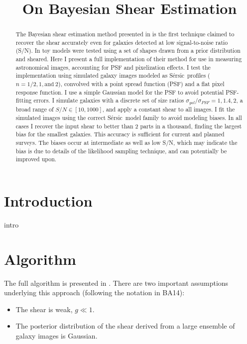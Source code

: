 \documentclass[12pt,preprint]{aastex}
\newcommand{\sersic}{S\'{e}rsic}
\begin{document}
\title{On Bayesian Shear Estimation}



\begin{abstract}

    The Bayesian shear estimation method presented in \cite{ba14} is the first
    technique claimed to recover the shear accurately even for galaxies
    detected at low signal-to-noise ratio (S/N).  In toy models were tested
    using a set of shapes drawn from a prior distribution and sheared.  Here I
    present a full implementation of their method for use in measuring
    astronomical images, accounting for PSF and pixelization effects.  I test
    the implementation using simulated galaxy images modeled as \sersic\
    profiles ($n=1/2, 1, \textrm{and} ~ 2$), convolved with a point spread
    function (PSF) and a flat pixel response function.  I use a simple Gaussian
    model for the PSF to avoid potential PSF-fitting errors. I simulate
    galaxies with a discrete set of size ratios $\sigma_{gal}/\sigma_{PSF} = 1,
    1.4, 2$, a broad range of $S/N \in [10,1000]$, and apply a constant shear
    to all images. I fit the simulated images using the correct
    \sersic\ model family to avoid modeling biases.   In all cases I recover
    the input shear to better than 2 parts in a thousand, finding the largest
    bias for the smallest galaxies.  This accuracy is sufficient for current
    and planned surveys.   The biases occur at intermediate as well as low S/N,
    which may indicate the bias is due to details of the likelihood sampling
    technique, and can potentially be improved upon.   

\end{abstract}

\section{Introduction} \label{sec:intro}

intro

\section{Algorithm} \label{sec:algo}

The full algorithm is presented in \citet[][BA14]{ba14}.  There are two
important assumptions underlying this approach (following the notation in
BA14):

\begin{itemize}

    \item The shear is weak, $g \ll 1$.

    \item The posterior distribution of the shear derived from a large ensemble
        of galaxy images is Gaussian.

\end{itemize}
\end{document}
